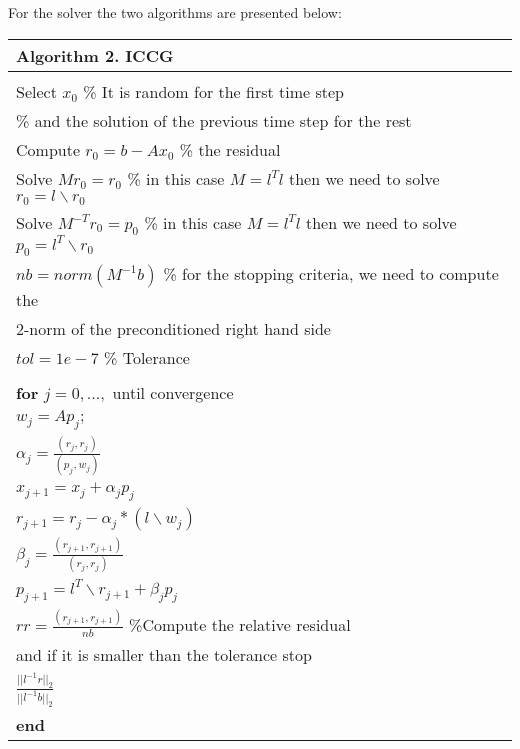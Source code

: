 \documentclass[12pt]{report}
\begin{document}
For the solver the two algorithms are presented below:\\
\begin{table}[!h]
\begin{tabular}{ |l | } 
\hline
  \textbf{Algorithm 2. ICCG} \\
  \hline
 \hline
\\
Select $x_0$ \% It is random for the first time step\\
\hspace{1.7cm} \% and the solution of the previous time step for the rest\\
Compute $r_0=b-Ax_0$ \% the residual\\
Solve $Mr_0=r_0$  \% in this case $M= l^T l$ then we need to solve $r_0=l \backslash r_0$ \\
Solve $M^{-T}r_0=p_0$  \% in this case $M= l^T l$ then we need to solve $p_0=l^{T} \backslash r_0$ \\
$nb=norm(M^{-1}b)$  \% for the stopping criteria, we need to compute the \\
\hspace{2.5cm} 2-norm of the preconditioned right hand side \\
$tol = 1e−7$ \% Tolerance\\
\\
\hspace{0.5cm}\textbf{for} $j=0,...,$ until convergence\\
 \hspace{1cm} $w_j=Ap_j;$\\ 
 \hspace{1cm}$\alpha_j=\frac{(r_j,r_j)}{(p_j,w_j)}$\\
 \hspace{1cm} $x_{j+1}=x_j+\alpha_jp_j$\\
 \hspace{1cm} $r_{j+1}=r_j-\alpha_j*(l\backslash w_j)$ \\
 \hspace{1cm} $\beta_j=\frac{(r_{j+1},r_{j+1})}{(r_j,r_j)}$\\ 
 \hspace{1cm} $p_{j+1}=l^{T}\backslash r_{j+1}+\beta_jp_j$ \\
\hspace{1cm} $rr=\frac{(r_{j+1},r_{j+1})}{nb}$ \%Compute the relative residual\\
\hspace{4cm} and if it is smaller than the tolerance stop\\
\hspace{4cm} $\frac{||l^{-1}r||_2}{||l^{-1}b||_2}$\\
\hspace{0.5cm}\textbf{end}\\
\hline
\end{tabular}
\end{table}
\end{document}
